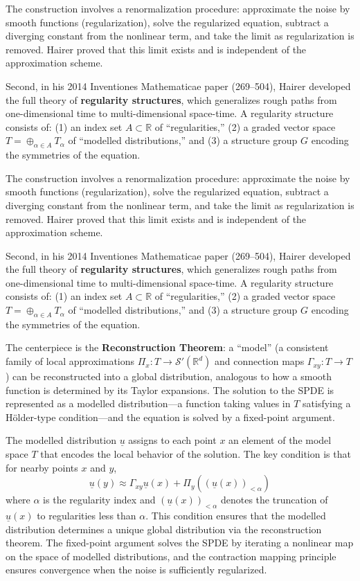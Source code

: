 The construction involves a renormalization procedure: approximate the noise by smooth functions (regularization), solve the regularized equation, subtract a diverging constant from the nonlinear term, and take the limit as regularization is removed. Hairer proved that this limit exists and is independent of the approximation scheme.

Second, in his 2014 Inventiones Mathematicae paper (269--504), Hairer developed the full theory of \textbf{regularity structures}, which generalizes rough paths from one-dimensional time to multi-dimensional space-time. A regularity structure consists of: (1) an index set $A \subset \mathbb{R}$ of ``regularities,'' (2) a graded vector space $T = \oplus_{\alpha\in A} T_\alpha$ of ``modelled distributions,'' and (3) a structure group $G$ encoding the symmetries of the equation.

The construction involves a renormalization procedure: approximate the noise by smooth functions (regularization), solve the regularized equation, subtract a diverging constant from the nonlinear term, and take the limit as regularization is removed. Hairer proved that this limit exists and is independent of the approximation scheme.

Second, in his 2014 Inventiones Mathematicae paper (269--504), Hairer developed the full theory of \textbf{regularity structures}, which generalizes rough paths from one-dimensional time to multi-dimensional space-time. A regularity structure consists of: (1) an index set $A \subset \mathbb{R}$ of ``regularities,'' (2) a graded vector space $T = \oplus_{\alpha\in A} T_\alpha$ of ``modelled distributions,'' and (3) a structure group $G$ encoding the symmetries of the equation.

The centerpiece is the \textbf{Reconstruction Theorem}: a ``model'' (a consistent family of local approximations $\Pi_x: T\to\mathcal{S}'(\mathbb{R}^d)$ and connection maps $\Gamma_{xy}: T\to T$) can be reconstructed into a global distribution, analogous to how a smooth function is determined by its Taylor expansions. The solution to the SPDE is represented as a modelled distribution---a function taking values in $T$ satisfying a H\"{o}lder-type condition---and the equation is solved by a fixed-point argument.

The modelled distribution $\underline{u}$ assigns to each point $x$ an element of the model space $T$ that encodes the local behavior of the solution. The key condition is that for nearby points $x$ and $y$,
\[
\underline{u}(y) \approx \Gamma_{xy} \underline{u}(x) + \Pi_y((\underline{u}(x))_{<\alpha})
\]
where $\alpha$ is the regularity index and $(\underline{u}(x))_{<\alpha}$ denotes the truncation of $\underline{u}(x)$ to regularities less than $\alpha$. This condition ensures that the modelled distribution determines a unique global distribution via the reconstruction theorem. The fixed-point argument solves the SPDE by iterating a nonlinear map on the space of modelled distributions, and the contraction mapping principle ensures convergence when the noise is sufficiently regularized.

